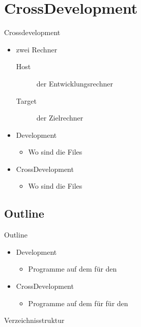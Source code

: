 \section{CrossDevelopment}
\begin{frame}{Crossdevelopment}
 \begin{itemize}
  \item zwei Rechner
  \begin{description}
   \item[Host] der Entwicklungsrechner
   \item[Target] \targetS der Zielrechner
  \end{description}
  \item Development
  \begin{itemize}
   \item Wo sind die Files
  \end{itemize}
  \item CrossDevelopment
  \begin{itemize}
   \item Wo sind die Files
  \end{itemize}
 \end{itemize}
\end{frame}

\subsection{Outline}
\begin{frame}{Outline}
 \begin{itemize}
  \item Development
  \begin{itemize}
   \item Programme auf dem \host für den \host
  \end{itemize}
  \item CrossDevelopment
  \begin{itemize}
   \item Programme auf dem \host für für den \target
  \end{itemize}
 \end{itemize}
\end{frame}

\begin{frame}{Verzeichnisstruktur}
\end{frame}



